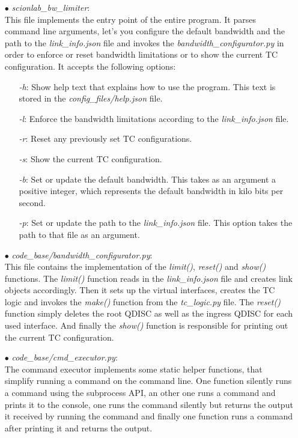 \begin{enumerate}
\item[$\bullet$]\textit{scionlab\_bw\_limiter}:
\\
This file implements the entry point of the entire program. It parses command line arguments, let's you configure the default bandwidth and the path to the \textit{link\_info.json} file and invokes the \textit{bandwidth\_configurator.py} in order to enforce or reset bandwidth limitations or to show the current \acs{TC} configuration. It accepts the following options:
	\begin{enumerate}
	\item[\textit{-h}:] Show help text that explains how to use the program. This text is stored in the \textit{config\_files/help.json} file.
	\item[\textit{-l}:] Enforce the bandwidth limitations according to the \textit{link\_info.json} file.
	\item[\textit{-r}:] Reset any previously set \acs{TC} configurations.
	\item[\textit{-s}:] Show the current \acs{TC} configuration.
	\item[\textit{-b}:] Set or update the default bandwidth. This takes as an argument a positive integer, which represents the default bandwidth in kilo bits per second.
	\item[\textit{-p}:] Set or update the path to the \textit{link\_info.json} file. This option takes the path to that file as an argument.
	\end{enumerate}

\item[$\bullet$]\textit{code\_base/bandwidth\_configurator.py}:
\\
This file contains the implementation of the \textit{limit()}, \textit{reset()} and \textit{show()} functions. The \textit{limit()} function reads in the \textit{link\_info.json} file and creates link objects accordingly. Then it sets up the virtual interfaces, creates the \acs{TC} logic and invokes the \textit{make()} function from the \textit{tc\_logic.py} file. The \textit{reset()} function simply deletes the root \acs{QDISC} as well as the ingress \acs{QDISC} for each used interface. And finally the \textit{show()} function is responsible for printing out the current \acs{TC} configuration.

\item[$\bullet$]\textit{code\_base/cmd\_executor.py}:
\\
The command executor implements some static helper functions, that simplify running a command on the command line. One function silently runs a command using the subprocess \acs{API}, an other one runs a command and prints it to the console, one runs the command silently but returns the output it received by running the command and finally one function runs a command after printing it and returns the output.


\end{enumerate}
